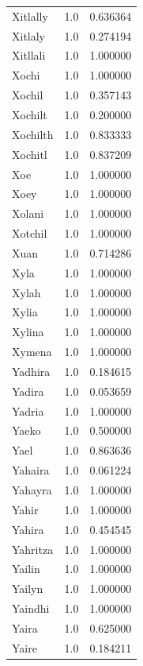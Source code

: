 \documentclass[
  letterpaper,
  DIV=11,
  numbers=noendperiod]{scrreprt}
\begin{document}
\begin{tabular}{lrr}
Xitlally        &   1.0 &   0.636364 \\
Xitlaly         &   1.0 &   0.274194 \\
Xitllali        &   1.0 &   1.000000 \\
Xochi           &   1.0 &   1.000000 \\
Xochil          &   1.0 &   0.357143 \\
Xochilt         &   1.0 &   0.200000 \\
Xochilth        &   1.0 &   0.833333 \\
Xochitl         &   1.0 &   0.837209 \\
Xoe             &   1.0 &   1.000000 \\
Xoey            &   1.0 &   1.000000 \\
Xolani          &   1.0 &   1.000000 \\
Xotchil         &   1.0 &   1.000000 \\
Xuan            &   1.0 &   0.714286 \\
Xyla            &   1.0 &   1.000000 \\
Xylah           &   1.0 &   1.000000 \\
Xylia           &   1.0 &   1.000000 \\
Xylina          &   1.0 &   1.000000 \\
Xymena          &   1.0 &   1.000000 \\
Yadhira         &   1.0 &   0.184615 \\
Yadira          &   1.0 &   0.053659 \\
Yadria          &   1.0 &   1.000000 \\
Yaeko           &   1.0 &   0.500000 \\
Yael            &   1.0 &   0.863636 \\
Yahaira         &   1.0 &   0.061224 \\
Yahayra         &   1.0 &   1.000000 \\
Yahir           &   1.0 &   1.000000 \\
Yahira          &   1.0 &   0.454545 \\
Yahritza        &   1.0 &   1.000000 \\
Yailin          &   1.0 &   1.000000 \\
Yailyn          &   1.0 &   1.000000 \\
Yaindhi         &   1.0 &   1.000000 \\
Yaira           &   1.0 &   0.625000 \\
Yaire           &   1.0 &   0.184211 \\

\end{tabular}
\end{document}
